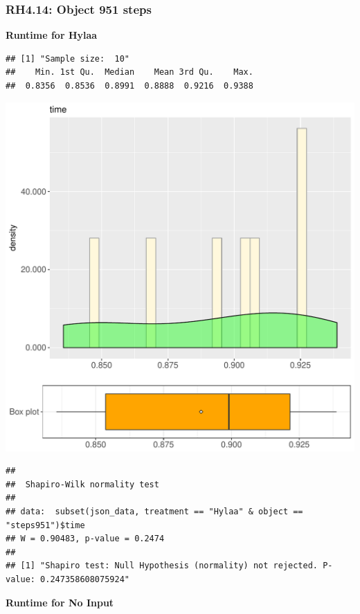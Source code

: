 \documentclass{article}\usepackage[]{graphicx}\usepackage[]{color}
\makeatletter
\def\maxwidth{ %
  \ifdim\Gin@nat@width>\linewidth
    \linewidth
  \else
    \Gin@nat@width
  \fi
}
\newenvironment{kframe}{%
 \def\at@end@of@kframe{}%
 \ifinner\ifhmode%
  \def\at@end@of@kframe{\end{minipage}}%
  \begin{minipage}{\columnwidth}%
 \fi\fi%
 \def\FrameCommand##1{\hskip\@totalleftmargin \hskip-\fboxsep
 \colorbox{shadecolor}{##1}\hskip-\fboxsep
     \hskip-\linewidth \hskip-\@totalleftmargin \hskip\columnwidth}%
 \MakeFramed {\advance\hsize-\width
   \@totalleftmargin\z@ \linewidth\hsize
   \@setminipage}}%
 {\par\unskip\endMakeFramed%
 \at@end@of@kframe}
\newenvironment{knitrout}{}{} %
\makeatother
\begin{document}
\subsubsection{RH4.14: Object 951 steps}

 \textbf{Runtime for Hylaa}
\begin{knitrout}
\color{fgcolor}\begin{kframe}
\begin{verbatim}
## [1] "Sample size:  10"
##    Min. 1st Qu.  Median    Mean 3rd Qu.    Max. 
##  0.8356  0.8536  0.8991  0.8888  0.9216  0.9388
\end{verbatim}
\end{kframe}
\includegraphics[width=\maxwidth]{figure/RH4_Hylaa_steps951-1} 
\begin{kframe}\begin{verbatim}
## 
## 	Shapiro-Wilk normality test
## 
## data:  subset(json_data, treatment == "Hylaa" & object == "steps951")$time
## W = 0.90483, p-value = 0.2474
## 
## [1] "Shapiro test: Null Hypothesis (normality) not rejected. P-value: 0.247358608075924"
\end{verbatim}
\end{kframe}
\end{knitrout}
 \textbf{Runtime for No Input}
\end{document}
